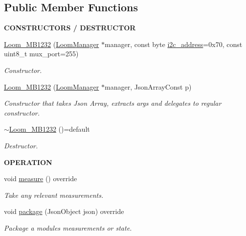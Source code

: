 \subsection*{Public Member Functions}
\begin{Indent}{\bf C\+O\+N\+S\+T\+R\+U\+C\+T\+O\+RS / D\+E\+S\+T\+R\+U\+C\+T\+OR}\par
\begin{DoxyCompactItemize}
\item 
\hyperlink{class_loom___m_b1232_ad84bb3599a2bee2505f1d9427cd72724}{Loom\+\_\+\+M\+B1232} (\hyperlink{class_loom_manager}{Loom\+Manager} $\ast$manager, const byte \hyperlink{class_loom_i2_c_sensor_a6ff389c1f015152a9ebfccb037d3d90e}{i2c\+\_\+address}=0x70, const uint8\+\_\+t mux\+\_\+port=255)
\begin{DoxyCompactList}\small\item\em Constructor. \end{DoxyCompactList}\item 
\hyperlink{class_loom___m_b1232_a255627986420d4676d80508ca6aa156f}{Loom\+\_\+\+M\+B1232} (\hyperlink{class_loom_manager}{Loom\+Manager} $\ast$manager, Json\+Array\+Const p)
\begin{DoxyCompactList}\small\item\em Constructor that takes Json Array, extracts args and delegates to regular constructor. \end{DoxyCompactList}\item 
\hyperlink{class_loom___m_b1232_abdfbbe04d1fe04dce5b047a01eb33b00}{$\sim$\+Loom\+\_\+\+M\+B1232} ()=default
\begin{DoxyCompactList}\small\item\em Destructor. \end{DoxyCompactList}\end{DoxyCompactItemize}
\end{Indent}
\begin{Indent}{\bf O\+P\+E\+R\+A\+T\+I\+ON}\par
\begin{DoxyCompactItemize}
\item 
void \hyperlink{class_loom___m_b1232_a2117216e8004b6fe4e386d6fea6a06fe}{measure} () override
\begin{DoxyCompactList}\small\item\em Take any relevant measurements. \end{DoxyCompactList}\item 
void \hyperlink{class_loom___m_b1232_ac08f29a40c91d9008dd355324b125bd9}{package} (Json\+Object json) override
\begin{DoxyCompactList}\small\item\em Package a modules measurements or state. \end{DoxyCompactList}\end{DoxyCompactItemize}
\end{Indent}
